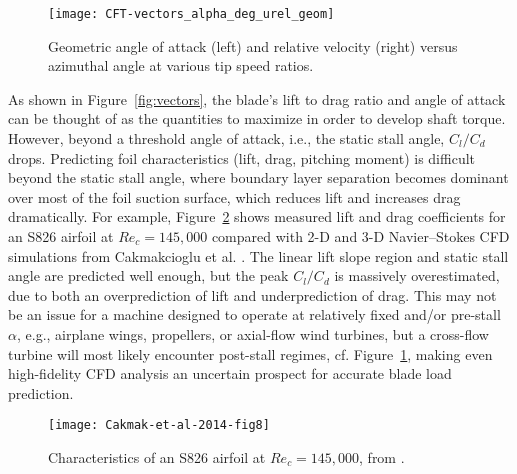 
\begin{figure}
    \centering

    \texttt{[image: CFT-vectors\_alpha\_deg\_urel\_geom]}

    \caption{Geometric angle of attack (left) and relative velocity (right)
        versus azimuthal angle at various tip speed ratios.}

    \label{fig:geom-alpha-urel}
\end{figure}

As shown in Figure~\ref{fig:vectors}, the blade's lift to drag ratio and angle
of attack can be thought of as the quantities to maximize in order to develop
shaft torque. However, beyond a threshold angle of attack, i.e., the static
stall angle, $C_l/C_d$ drops. Predicting foil characteristics (lift, drag,
pitching moment) is difficult beyond the static stall angle, where boundary
layer separation becomes dominant over most of the foil suction surface, which
reduces lift and increases drag dramatically. For example,
Figure~\ref{fig:S826-perf} shows measured lift and drag coefficients for an S826
airfoil at $Re_c=145,000$ compared with 2-D and 3-D Navier--Stokes CFD
simulations from Cakmakcioglu et al. \cite{Cakmakcioglu2014}. The linear lift
slope region and static stall angle are predicted well enough, but the peak
$C_l/C_d$ is massively overestimated, due to both an overprediction of lift and
underprediction of drag. This may not be an issue for a machine designed to
operate at relatively fixed and/or pre-stall $\alpha$, e.g., airplane wings,
propellers, or axial-flow wind turbines, but a cross-flow turbine will most
likely encounter post-stall regimes, cf. Figure~\ref{fig:geom-alpha-urel},
making even high-fidelity CFD analysis an uncertain prospect for accurate blade
load prediction.


\begin{figure}
    \centering

    \texttt{[image: Cakmak-et-al-2014-fig8]}

    \caption{Characteristics of an S826 airfoil at $Re_c=145,000$, from
        \cite{Cakmakcioglu2014}.}

    \label{fig:S826-perf}
\end{figure}


